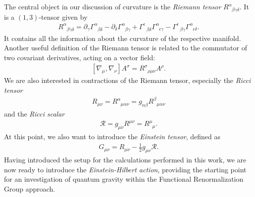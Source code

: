 The central object in our discussion of curvature is the \textit{Riemann tensor} $R_{\phantom{\alpha}\beta \gamma \delta}^{\alpha}$. It is a $(1, 3)$-tensor given by
\begin{align} 
	R_{\phantom{\alpha}\beta \gamma \delta}^{\alpha}=\partial_{\gamma} \Gamma_{\phantom{\alpha}\beta \delta}^{\alpha}-\partial_{\delta} \Gamma_{\phantom{\alpha}\beta \gamma}^{\alpha}+\Gamma_{\phantom{\alpha}\beta \delta}^{\epsilon} \Gamma_{\phantom{\alpha}\epsilon \gamma}^{\alpha}-\Gamma_{\phantom{\alpha}\beta \gamma}^{\epsilon} \Gamma_{\phantom{\alpha}\epsilon \delta}^{\alpha}.
\end{align}
It contains all the information about the curvature of the respective manifold. Another useful definition of the Riemann tensor is related to the commutator of two covariant derivatives, acting on a vector field:
\begin{align}
	\left[\nabla_{\mu}, \nabla_{\nu}\right] A^{\sigma}=R_{\phantom{\alpha}\rho \mu \nu}^{\sigma} A^{\rho}. \label{eqn:Riemann}
\end{align}
We are also interested in contractions of the Riemann tensor, especially the \textit{Ricci tensor} 
\begin{align}
	R_{\mu\nu} = R^{\alpha}_{\phantom{\alpha}\mu\alpha\nu} = g_{\alpha\beta} R^{\beta}_{\phantom{\alpha}\mu\alpha\nu}
\end{align}
and the \textit{Ricci scalar} 
\begin{align}
\mathcal{R} = g_{\mu\nu}R^{\mu\nu} = R^{\mu}_{\phantom{\mu}\mu}.
\end{align}
At this point, we also want to introduce the \textit{Einstein tensor}, defined as
\begin{align}
	 G_{\mu\nu} = R_{\mu\nu} - \frac{1}{2}g_{\mu\nu}\mathcal{R}.
\end{align}
Having introduced the setup for the calculations performed in this work, we are now ready to introduce the \textit{Einstein-Hilbert action}, providing the starting point for an investigation of quantum gravity within the Functional Renormalization Group approach. 
